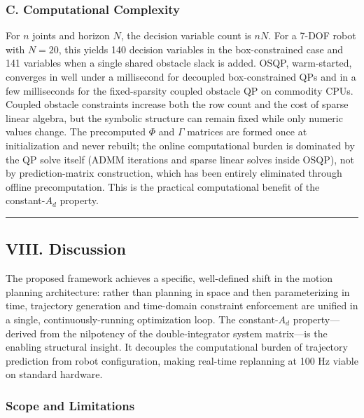 \subsubsection{C. Computational
Complexity}\label{c.-computational-complexity}

For \(n\) joints and horizon \(N\), the decision variable count is
\(nN\). For a 7-DOF robot with \(N = 20\), this yields 140 decision
variables in the box-constrained case and 141 variables when a single
shared obstacle slack is added. OSQP, warm-started, converges in well
under a millisecond for decoupled box-constrained QPs and in a few
milliseconds for the fixed-sparsity coupled obstacle QP on commodity
CPUs. Coupled obstacle constraints increase both the row count and the
cost of sparse linear algebra, but the symbolic structure can remain
fixed while only numeric values change. The precomputed \(\Phi\) and
\(\Gamma\) matrices are formed once at initialization and never rebuilt;
the online computational burden is dominated by the QP solve itself
(ADMM iterations and sparse linear solves inside OSQP), not by
prediction-matrix construction, which has been entirely eliminated
through offline precomputation. This is the practical computational
benefit of the constant-\(A_d\) property.

\begin{center}\rule{0.5\linewidth}{0.5pt}\end{center}

\subsection{VIII. Discussion}\label{viii.-discussion}

The proposed framework achieves a specific, well-defined shift in the
motion planning architecture: rather than planning in space and then
parameterizing in time, trajectory generation and time-domain constraint
enforcement are unified in a single, continuously-running optimization
loop. The constant-\(A_d\) property---derived from the nilpotency of the
double-integrator system matrix---is the enabling structural insight. It
decouples the computational burden of trajectory prediction from robot
configuration, making real-time replanning at 100 Hz viable on standard
hardware.

\subsubsection{Scope and Limitations}\label{scope-and-limitations}

